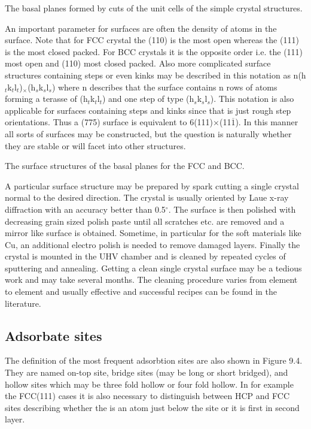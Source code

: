 \vspace*{11cm}

 The basal planes formed by cuts of the unit cells of the simple crystal structures.

\vspace{1cm}

 An important parameter for surfaces are often the density of atoms in the surface. Note that for FCC crystal the (110) is the most open whereas the (111) is the most closed packed. For BCC crystals it is the opposite order i.e. the (111) most open and (110) most closed packed. Also more complicated surface structures containing steps or even kinks may be described in this notation as n(h$_t$k$_t$l$_t$)$_{\times}$(h$_s$k$_s$l$_s$) where n describes that the surface contains n rows of atoms forming a terasse of (h$_t$k$_t$l$_t$) and one step of type (h$_s$k$_s$l$_s$). This notation is also applicable for surfaces containing steps and kinks since that is just rough step orientations. Thus a (775) surface is equivalent to  6(111)${\times}$(11$\overline{1}$). In this manner all sorts of surfaces may be constructed, but the question is naturally whether they are stable or will facet into other structures. 



\vspace*{11cm}

 The surface structures of the basal planes for the FCC  and  BCC.

\vspace{1cm}

A particular surface structure may be prepared by spark cutting a single crystal normal to the desired direction. The crystal is usually oriented by Laue x-ray diffraction with an accuracy better than 0.5$^{\circ}$. The surface is then polished with decreasing grain sized polish paste until all scratches etc. are removed and a mirror like surface is obtained. Sometime, in particular for the soft materials like Cu, an additional electro polish is needed to remove damaged layers. Finally the crystal is mounted in the UHV chamber and is cleaned by repeated cycles of sputtering and annealing. Getting a clean single crystal surface may be a tedious work and may take several months. The cleaning procedure varies from element to element and usually effective and successful recipes can be found in the literature.

\subsection{Adsorbate sites}
 The definition of the most frequent  adsorbtion sites are also shown  in Figure 9.4. They are named on-top site, bridge sites  (may be long or short bridged), and hollow sites which may be three fold hollow or four fold hollow. In for example the FCC(111) cases it is also necessary to distinguish between HCP and FCC sites describing whether the is an atom just below the site or it is first in second layer.

